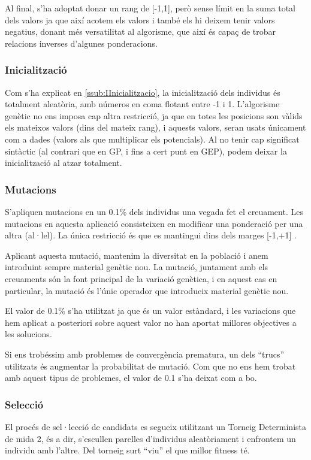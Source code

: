 Al final, s'ha adoptat donar un rang de [-1,1], però sense límit en la suma total
dels valors ja que així acotem els valors i també els hi deixem tenir valors
negatius, donant més versatilitat al algorisme, que així és capaç de trobar
relacions inverses d'algunes ponderacions.



\subsubsection{Inicialització} %
\label{ssub:Inicialitzacio}
Com s'ha explicat en \ref{ssub:IInicialitzacio}, la inicialització dels individus és totalment
aleatòria, amb números en coma flotant entre -1 i 1.  L'algorisme genètic no ens
imposa cap altra restricció, ja que en totes les posicions son vàlids els
mateixos valors (dins del mateix rang), i aquests valors, seran usats únicament
com a dades (valors als que multiplicar els potencials).  Al no tenir cap
significat sintàctic (al contrari que en GP, i fins a cert punt en GEP), podem
deixar la inicialització al atzar totalment.

\subsubsection{Mutacions} %
\label{ssub:Mutacions}

S'apliquen mutacions en un 0.1\% dels individus una vegada fet el creuament.
Les mutacions en aquesta aplicació consisteixen en modificar una ponderació per
una altra (al·lel).  La única restricció és que es mantingui dins dels marges
[-1,+1] .  

Aplicant aquesta mutació, mantenim la diversitat en la població i anem
introduint sempre material genètic nou.  La mutació, juntament amb els
creuaments són la font principal de la variació genètica, i en aquest cas en
particular, la mutació és l'únic operador que introdueix material genètic nou.

El valor de 0.1\% s'ha utilitzat ja que és un valor estàndard, i les variacions
que hem aplicat a posteriori sobre aquest valor no han aportat millores
objectives a les solucions.

Si ens trobéssim amb problemes de convergència prematura, un dels ``trucs''
utilitzats és augmentar la probabilitat de mutació.  Com que no ens hem trobat
amb aquest tipus de problemes, el valor de 0.1 s'ha deixat com a bo.

\subsubsection{Selecció} %
\label{ssub:Seleccio}
El procés de sel·lecció de candidats es segueix utilitzant un Torneig
Determinista de mida 2, és a dir, s'escullen parelles d'individus
aleatòriament i enfrontem un individu amb l'altre. Del torneig surt ``viu'' el
que millor fitness té.

